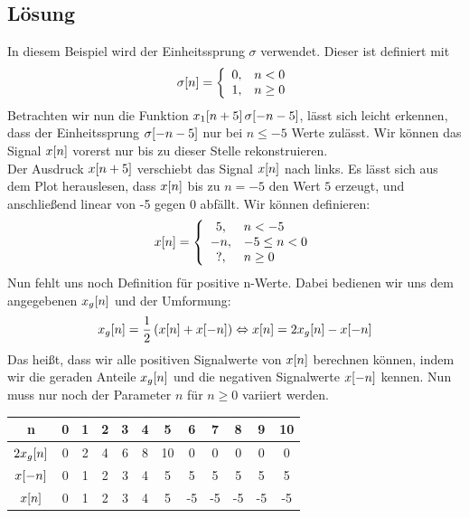 \subsection*{Lösung}
	In diesem Beispiel wird der Einheitssprung $\sigma$ verwendet. Dieser ist definiert mit
	\[
		\sigma\negthinspace\left[n\right]=\left\{\begin{array}{cl} 0, & n<0\\1, & n\ge 0 \end{array} \right.
	\]
	Betrachten wir nun die Funktion $x_1\negthinspace\left[n+5\right]\sigma \negthinspace\left[-n-5\right]$, lässt sich leicht erkennen, dass der Einheitssprung $\sigma \negthinspace\left[-n-5\right]$ nur bei $n\le -5$ Werte zulässt. Wir können das Signal $x\negthinspace\left[n\right]$ vorerst nur bis zu dieser Stelle rekonstruieren.\\
	Der Ausdruck $x\negthinspace\left[n+5\right]$ verschiebt das Signal $x\negthinspace\left[n\right]$ nach links. Es lässt sich aus dem Plot herauslesen, dass $x\negthinspace\left[n\right]$ bis zu $n=-5$ den Wert $5$ erzeugt, und anschließend linear von -5 gegen 0 abfällt. Wir können definieren:
	\[
		x\negthinspace\left[n\right]=\left\{\begin{array}{cl} 5, & n < -5\\-n, & -5\le n<0\\?, & n\ge 0 \end{array} \right.
	\]
	Nun fehlt uns noch Definition für positive n-Werte. Dabei bedienen wir uns dem angegebenen $x_g\negthinspace\left[n\right]$ und der Umformung:
	\[
		x_g\negthinspace\left[n\right]=\frac{1}{2} \left(x\negthinspace\left[n\right]+x\negthinspace\left[-n\right]\right)\Leftrightarrow x\negthinspace\left[n\right]=2x_g\negthinspace\left[n\right]-x\negthinspace\left[-n\right]
	\]
	Das heißt, dass wir alle positiven Signalwerte von $x\negthinspace\left[n\right]$ berechnen können, indem wir die geraden Anteile $x_g\negthinspace\left[n\right]$ und die negativen Signalwerte $x\negthinspace\left[-n\right]$ kennen. Nun muss nur noch der Parameter $n$ für $n \ge 0$ variiert werden.
	\begin{center}
		\begin{tabular}{|c|c|c|c|c|c|c|c|c|c|c|c|}
		\hline n & 0 & 1 & 2 & 3 & 4 & 5 & 6 & 7 & 8 & 9 & 10 \\
		\hline $2x_g\negthinspace\left[n\right]$ & 0 & 2 & 4 & 6 & 8 & 10 & 0 & 0 & 0 & 0 & 0 \\
		\hline $x\negthinspace\left[-n\right]$ & 0 & 1 & 2 & 3 & 4 & 5 & 5 & 5 & 5 & 5 & 5 \\
		\hline $x\negthinspace\left[n\right]$ & 0 & 1 & 2 & 3 & 4 & 5 & -5 & -5 & -5 & -5 & -5 \\ 
		\hline 
		\end{tabular} 
	\end{center}
